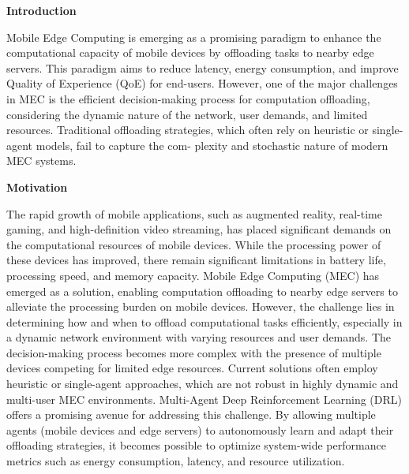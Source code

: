 \documentclass[12pt]{article}
\begin{document}
\noindent\large\textbf{Introduction}

\vspace{1.5mm}
\normalsize

Mobile Edge Computing is emerging as a promising paradigm to enhance the computational capacity of mobile devices by offloading tasks to nearby edge servers. This paradigm aims to reduce latency, energy consumption, and improve Quality of Experience (QoE) for end-users. However, one of the major challenges in MEC is the efficient decision-making process for computation offloading, considering the dynamic nature of the network, user demands, and limited resources. Traditional offloading strategies, which often rely on heuristic or single-agent models, fail to capture the com- plexity and stochastic nature of modern MEC systems. 


	
\vspace{8mm}

\noindent\textbf{\large Motivation}

\vspace{1.5mm}

The rapid growth of mobile applications, such as augmented reality, real-time gaming, and high-definition video streaming, has placed significant demands on the computational resources of mobile devices. While the processing power of these devices has improved, there remain significant limitations in battery life, processing speed, and memory capacity. Mobile Edge Computing (MEC) has emerged as a solution, enabling computation offloading to nearby edge servers to alleviate the processing burden on mobile devices. However, the challenge lies in determining how and when to offload computational tasks efficiently, especially in a dynamic network environment with varying resources and user demands. The decision-making process becomes more complex with the presence of multiple devices competing for limited edge resources. Current solutions often employ heuristic or single-agent approaches, which are not robust in highly dynamic and multi-user MEC environments. Multi-Agent Deep Reinforcement Learning (DRL) offers a promising avenue for addressing this challenge. By allowing multiple agents (mobile devices and edge servers) to autonomously learn and adapt their offloading strategies, it becomes possible to optimize system-wide performance metrics such as energy consumption, latency, and resource utilization. 
\end{document}
